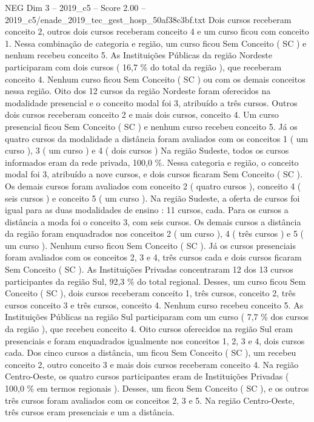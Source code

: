 \begin{textsample}{NEG Dim 3 – 2019\_c5 – Score 2.00 – 2019\_c5/enade\_2019\_tec\_gest\_hosp\_50af38c3bf.txt}
Dois cursos receberam conceito 2, outros dois cursos receberam conceito 4 e um curso ficou com conceito 1.
Nessa combinação de categoria e região, um curso ficou Sem Conceito ( SC ) e nenhum recebeu conceito 5.
As Instituições Públicas da região Nordeste participaram com dois cursos ( 16,7 \% do total da região ), que receberam conceito 4.
Nenhum curso ficou Sem Conceito ( SC ) ou com os demais conceitos nessa região.
Oito dos 12 cursos da região Nordeste foram oferecidos na modalidade presencial e o conceito modal foi 3, atribuído a três cursos.
Outros dois cursos receberam conceito 2 e mais dois cursos, conceito 4.
Um curso presencial ficou Sem Conceito ( SC ) e nenhum curso recebeu conceito 5.
Já os quatro cursos da modalidade a distância foram avaliados com os conceitos 1 ( um curso ), 3 ( um curso ) e 4 ( dois cursos ) Na região Sudeste, todos os cursos informados eram da rede privada, 100,0 \%.
Nessa categoria e região, o conceito modal foi 3, atribuído a nove cursos, e dois cursos ficaram Sem Conceito ( SC ).
Os demais cursos foram avaliados com conceito 2 ( quatro cursos ), conceito 4 ( seis cursos ) e conceito 5 ( um curso ).
Na região Sudeste, a oferta de cursos foi igual para as duas modalidades de ensino : 11 cursos, cada.
Para os cursos a distância a moda foi o conceito 3, com seis cursos.
Os demais cursos a distância da região foram enquadrados nos conceitos 2 ( um curso ), 4 ( três cursos ) e 5 ( um curso ).
Nenhum curso ficou Sem Conceito ( SC ).
Já os cursos presenciais foram avaliados com os conceitos 2, 3 e 4, três cursos cada e dois cursos ficaram Sem Conceito ( SC ).
As Instituições Privadas concentraram 12 dos 13 cursos participantes da região Sul, 92,3 \% do total regional.
Desses, um curso ficou Sem Conceito ( SC ), dois cursos receberam conceito 1, três cursos, conceito 2, três cursos conceito 3 e três cursos, conceito 4.
Nenhum curso recebeu conceito 5.
As Instituições Públicas na região Sul participaram com um curso ( 7,7 \% dos cursos da região ), que recebeu conceito 4.
Oito cursos oferecidos na região Sul eram presenciais e foram enquadrados igualmente nos conceitos 1, 2, 3 e 4, dois cursos cada.
Dos cinco cursos a distância, um ficou Sem Conceito ( SC ), um recebeu conceito 2, outro conceito 3 e mais dois cursos receberam conceito 4.
Na região Centro-Oeste, os quatro cursos participantes eram de Instituições Privadas ( 100,0 \% em termos regionais ).
Desses, um ficou Sem Conceito ( SC ), e os outros três cursos foram avaliados com os conceitos 2, 3 e 5.
Na região Centro-Oeste, três cursos eram presenciais e um a distância.

\end{textsample}
